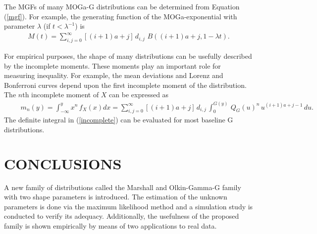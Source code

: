 \documentclass[twoside,leqno,11pt]{article}
\begin{document}
The MGFs of many MOGa-G distributions can be determined from Equation (\ref{mgf}).
For example, the generating function of the MOGa-exponential with parameter $\lambda$
(if $t<\lambda^{-1}$) is
\begin{eqnarray*}
\displaystyle
M(t)=\sum_{i,j=0}^{\infty} [(i+1)a+j]\,d_{i,j}\,\,B((i+1)a+j,1-\lambda t).
\end{eqnarray*}

For empirical purposes, the shape of many distributions can be usefully described by
the incomplete moments. These moments play an important role for measuring
inequa\-lity. For example, the mean deviations and Lorenz and Bonferroni curves depend upon the first incomplete moment of the distribution.
The $n$th incomplete moment of $X$ can be expressed as
{\footnotesize
\begin{eqnarray}\label{incomplete}
\displaystyle
\qquad
m_{n}(y)=\int_{-\infty}^y x^n\,f_{X}(x) dx = \sum_{i,j=0}^{\infty} [(i+1)a+j]\,d_{i,j}\,\int_{0}^{G(y)}\,Q_G(u)^n\, u^{(i+1)a+j-1}\,du.
\end{eqnarray}
}
The definite integral in (\ref{incomplete}) can be evaluated for most baseline G distributions.


\section{CONCLUSIONS}\label{conclusions}

A new family of distributions called the Marshall and Olkin-Gamma-G family with two shape parameters is introduced. The estimation of the unknown
parameters is done via the maximum likelihood method and a simulation study is conducted to verify its adequacy. Additionally, the usefulness
of the proposed family is shown empirically by means of two applications to real data.
\end{document}
